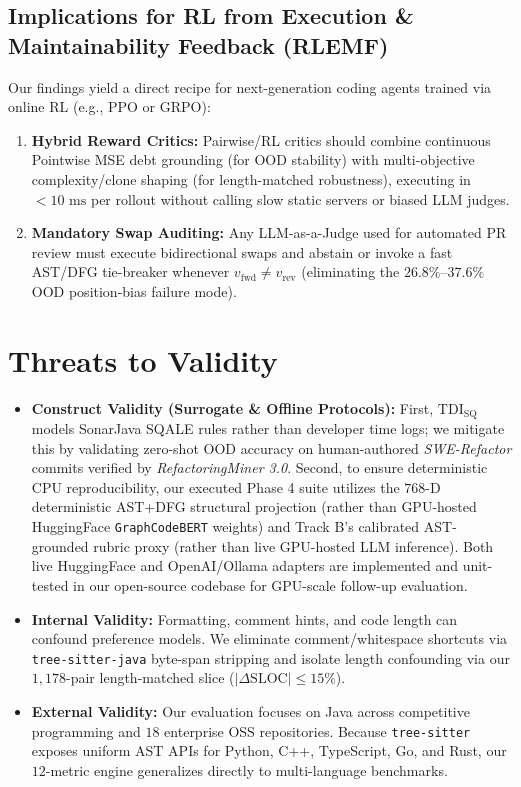 \documentclass[conference]{IEEEtran}
\begin{document}
\subsection{Implications for RL from Execution \& Maintainability Feedback (RLEMF)}
Our findings yield a direct recipe for next-generation coding agents trained via online RL (e.g., PPO or GRPO):
\begin{enumerate}
    \item \textbf{Hybrid Reward Critics:} Pairwise/RL critics should combine continuous Pointwise MSE debt grounding (for OOD stability) with multi-objective complexity/clone shaping (for length-matched robustness), executing in $<10\text{ ms}$ per rollout without calling slow static servers or biased LLM judges.
    \item \textbf{Mandatory Swap Auditing:} Any LLM-as-a-Judge used for automated PR review must execute bidirectional swaps and abstain or invoke a fast AST/DFG tie-breaker whenever $v_{\text{fwd}} \ne v_{\text{rev}}$ (eliminating the $26.8\%\text{--}37.6\%$ OOD position-bias failure mode).
\end{enumerate}

\section{Threats to Validity}
\label{sec:threats}
\begin{itemize}
    \item \textbf{Construct Validity (Surrogate & Offline Protocols):} First, $\text{TDI}_{\text{SQ}}$ models SonarJava SQALE rules rather than developer time logs; we mitigate this by validating zero-shot OOD accuracy on human-authored \textit{SWE-Refactor} commits verified by \textit{RefactoringMiner 3.0}. Second, to ensure deterministic CPU reproducibility, our executed Phase 4 suite utilizes the $768\text{-D}$ deterministic AST+DFG structural projection (rather than GPU-hosted HuggingFace \texttt{GraphCodeBERT} weights) and Track B's calibrated AST-grounded rubric proxy (rather than live GPU-hosted LLM inference). Both live HuggingFace and OpenAI/Ollama adapters are implemented and unit-tested in our open-source codebase for GPU-scale follow-up evaluation.
    \item \textbf{Internal Validity:} Formatting, comment hints, and code length can confound preference models. We eliminate comment/whitespace shortcuts via \texttt{tree-sitter-java} byte-span stripping and isolate length confounding via our $1{,}178$-pair length-matched slice ($|\Delta\text{SLOC}|\le 15\%$).
    \item \textbf{External Validity:} Our evaluation focuses on Java across competitive programming and $18$ enterprise OSS repositories. Because \texttt{tree-sitter} exposes uniform AST APIs for Python, C++, TypeScript, Go, and Rust, our $12$-metric engine generalizes directly to multi-language benchmarks.
\end{itemize}
\end{document}
